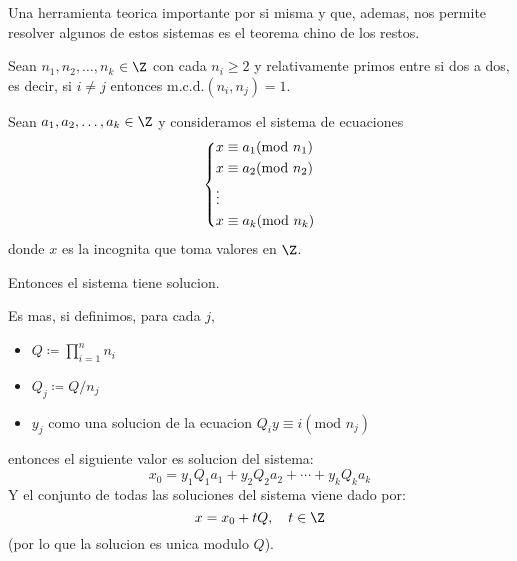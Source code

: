 Una herramienta teorica importante por si misma y que, ademas, nos permite resolver algunos de estos sistemas es el teorema chino de los restos.

\begin{theorem}
	Sean \(n_1, n_2, \ldots, n_k \) \(\in  \Z \) con cada \(n_i \geq 2 \) y relativamente primos entre si dos a dos, es decir, si \(i \neq j \) entonces \(\mathrm{m.c.d.}(n_i,n_j 	) = 1 	 \).

	Sean \(a_1, a_2, \ldots, a_k \in \Z\) y consideramos el sistema de ecuaciones
	\[
		\begin{dcases}
			x \equiv a_1 (\text{mod } n_1 ) \\
			x \equiv a_2 (\text{mod } n_2 ) \\
			\vdots                          \\
			x \equiv a_k (\text{mod } n_k ) \\
		\end{dcases}
	\]
	donde \(x \) es la incognita que toma valores en \(\Z \).

	Entonces el sistema tiene solucion.

	Es mas, si definimos, para cada \(j \),
	\begin{itemize}
		\item \(Q \coloneqq \prod\limits_{i =1}^{n } n_i \)
		\item \(Q_j \coloneqq Q / n_j 	\)
		\item \(y_j \) como una solucion de la ecuacion \(Q_i y \equiv i (\text{mod } n_j 	 )\)
	\end{itemize}
	entonces el siguiente valor es solucion del sistema:
	\[
		x_{0} = y_1 Q_1 a_{1} + y_2 Q_2 a_2 + \cdots + y_k Q_k a_k
	\]
	Y el conjunto de todas las soluciones del sistema viene dado por:
	\[
		x = x_0 + tQ, \quad t \in \Z
	\]
	(por lo que la solucion es unica modulo \(Q \)).
\end{theorem}
